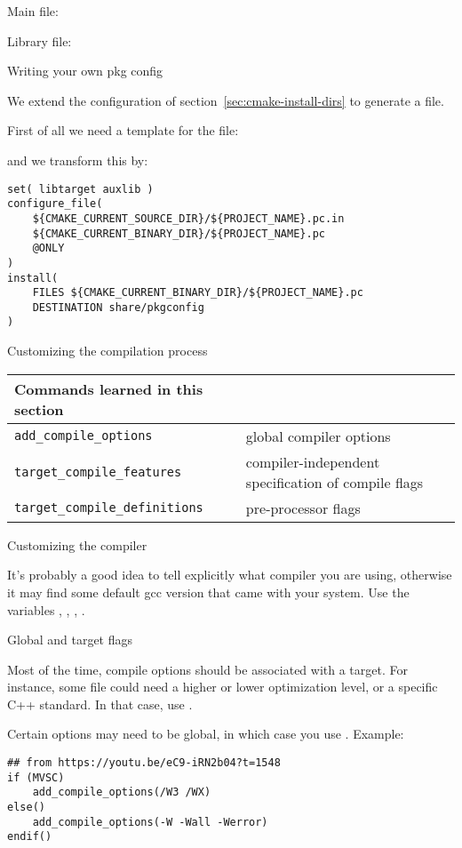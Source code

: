 Main file:
%


Library file:
%



 {Writing your own pkg config}

We extend the configuration of section~\ref{sec:cmake-install-dirs}
to generate a  file.

First of all we need a template for the  file:
%


and we transform this by:
%
\begin{lstlisting}
set( libtarget auxlib )
configure_file(
    ${CMAKE_CURRENT_SOURCE_DIR}/${PROJECT_NAME}.pc.in
    ${CMAKE_CURRENT_BINARY_DIR}/${PROJECT_NAME}.pc
    @ONLY
)  
install(
    FILES ${CMAKE_CURRENT_BINARY_DIR}/${PROJECT_NAME}.pc
    DESTINATION share/pkgconfig
)
\end{lstlisting}

 {Customizing the compilation process}

\begin{tabular}{lp{3in}}
  \toprule
  Commands learned in this section\\
  \midrule
  \lstinline+add_compile_options+&global compiler options\\
  \lstinline+target_compile_features+&compiler-independent specification of compile flags\\
  \lstinline+target_compile_definitions+&pre-processor flags\\
  \bottomrule
\end{tabular}

 {Customizing the compiler}

It's probably a good idea to tell  explicitly what compiler you are using,
otherwise it may find some default gcc version that came with your system.
Use the variables , ,
,
.

 {Global and target flags}

Most of the time, compile options should be associated with a target.
For instance, some file could need a higher or lower optimization level,
or a specific C++ standard.
In that case, use .

Certain options may need to be global, in which case you use
. Example:
\begin{lstlisting}
## from https://youtu.be/eC9-iRN2b04?t=1548
if (MVSC)
    add_compile_options(/W3 /WX)
else()
    add_compile_options(-W -Wall -Werror)
endif()
\end{lstlisting}

